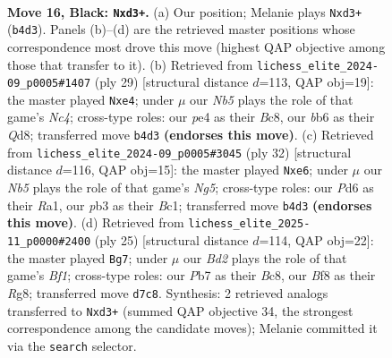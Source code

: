 \documentclass[11pt]{article}
\begin{document}
\clearpage

\begin{figure}[p]\centering
\begin{subfigure}{0.46\textwidth}\centering
\resizebox{\linewidth}{!}{%
\newchessgame
\chessboard[
  setfen={r3kb1r/1p1bpp1n/1B1p2p1/qN5p/1n2P3/1PNB1P2/P1P2QPP/2K1R2R b kq - 2 16},
  showmover=false,
  pgfstyle=straightmove, color=movearrow, markmove={b4-d3}
]}
\caption{}
\end{subfigure}\hfill
\begin{subfigure}{0.46\textwidth}\centering
\resizebox{\linewidth}{!}{%
\newchessgame
\chessboard[
  setfen={r1bqr1k1/1p3ppp/p2b4/2np4/3NB3/1PN1P2P/PBQ2PP1/R2R2K1 b - - 0 15},
  showmover=false,
  pgfstyle=straightmove, color=movearrow, markmove={c5-e4}
]}
\caption{}
\end{subfigure}
\\[4pt]
\begin{subfigure}{0.46\textwidth}\centering
\resizebox{\linewidth}{!}{%
\newchessgame
\chessboard[
  setfen={3qr1k1/1p2bppp/r3bn2/p2p2N1/P1nP4/1QN3P1/1P2P1BP/R1B2RK1 w - - 6 17},
  showmover=false,
  pgfstyle=straightmove, color=movearrow, markmove={g5-e6}
]}
\caption{}
\end{subfigure}\hfill
\begin{subfigure}{0.46\textwidth}\centering
\resizebox{\linewidth}{!}{%
\newchessgame
\chessboard[
  setfen={r1b1kbr1/1p1n1p1p/pqn1p3/3pP3/3N1B2/2P2NP1/PP5P/R1Q1KB1R b KQq - 0 13},
  showmover=false,
  pgfstyle=straightmove, color=movearrow, markmove={f8-g7}
]}
\caption{}
\end{subfigure}
\caption{\textbf{Move 16, Black: \texttt{Nxd3+}.} (a) Our position; Melanie plays \texttt{Nxd3+} (\texttt{b4d3}). Panels (b)--(d) are the retrieved master positions whose correspondence most drove this move (highest QAP objective among those that transfer to it). (b) Retrieved from \texttt{lichess\_elite\_2024-09\_p0005\#1407} (ply 29) [structural distance $d$=113, QAP obj=19]: the master played \texttt{Nxe4}; under $\mu$ our \emph{Nb5} plays the role of that game's \emph{Nc4}; cross-type roles: our \emph{p}e4 as their \emph{B}c8, our \emph{b}b6 as their \emph{Q}d8; transferred move \texttt{b4d3} \textbf{(endorses this move)}. (c) Retrieved from \texttt{lichess\_elite\_2024-09\_p0005\#3045} (ply 32) [structural distance $d$=116, QAP obj=15]: the master played \texttt{Nxe6}; under $\mu$ our \emph{Nb5} plays the role of that game's \emph{Ng5}; cross-type roles: our \emph{P}d6 as their \emph{R}a1, our \emph{p}b3 as their \emph{B}c1; transferred move \texttt{b4d3} \textbf{(endorses this move)}. (d) Retrieved from \texttt{lichess\_elite\_2025-11\_p0000\#2400} (ply 25) [structural distance $d$=114, QAP obj=22]: the master played \texttt{Bg7}; under $\mu$ our \emph{Bd2} plays the role of that game's \emph{Bf1}; cross-type roles: our \emph{P}b7 as their \emph{B}c8, our \emph{B}f8 as their \emph{R}g8; transferred move \texttt{d7c8}. Synthesis: 2 retrieved analogs transferred to \texttt{Nxd3+} (summed QAP objective 34, the strongest correspondence among the candidate moves); Melanie committed it via the \texttt{search} selector.}
\label{fig:thought-m31}
\end{figure}
\end{document}

